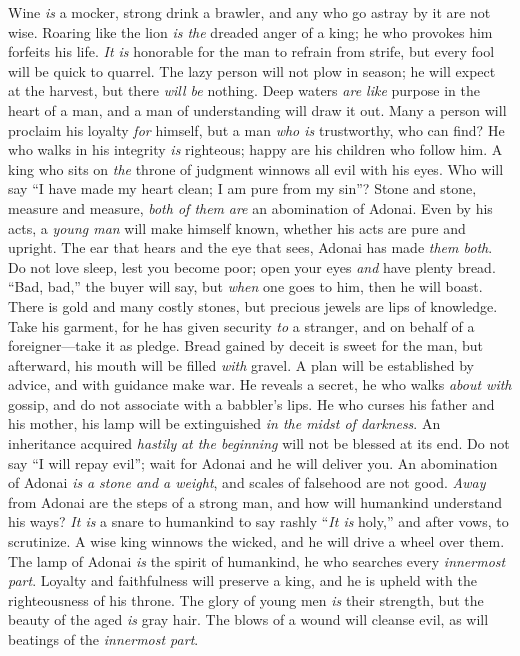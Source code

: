 \begin{biblechapter} %
\verse Wine \textit{is} a mocker, strong drink a brawler, 
and any who go astray by it are not wise.
\verse Roaring like the lion \textit{is the} dreaded anger of a king; 
he who provokes him forfeits his life.
\verse \textit{It is} honorable for the man to refrain from strife, 
but every fool will be quick to quarrel.
\verse The lazy person will not plow in season; 
he will expect at the harvest, but there \textit{will be} nothing.
\verse Deep waters \textit{are like} purpose in the heart of a man, 
and a man of understanding will draw it out.
\verse Many a person will proclaim his loyalty \textit{for} himself, 
but a man \textit{who is} trustworthy, who can find?
\verse He who walks in his integrity \textit{is} righteous; 
happy are his children who follow him.
\verse A king who sits on \textit{the} throne of judgment 
winnows all evil with his eyes.
\verse Who will say “I have made my heart clean; 
I am pure from my sin”?
\verse Stone and stone, measure and measure, 
\textit{both of them} \textit{are} an abomination of Adonai.
\verse Even by his acts, a \textit{young man} will make himself known, 
whether his acts are pure and upright.
\verse The ear that hears and the eye that sees, 
Adonai has made \textit{them both}.
\verse Do not love sleep, lest you become poor; 
open your eyes \textit{and} have plenty bread.
\verse “Bad, bad,” the buyer will say, 
but \textit{when} one goes to him, then he will boast.
\verse There is gold and many costly stones, 
but precious jewels are lips of knowledge.
\verse Take his garment, for he has given security \textit{to} a stranger, 
and on behalf of a foreigner—take it as pledge.
\verse Bread gained by deceit is sweet for the man, 
but afterward, his mouth will be filled \textit{with} gravel.
\verse A plan will be established by advice, 
and with guidance make war.
\verse He reveals a secret, he who walks \textit{about with} gossip, 
and do not associate with a babbler’s lips.
\verse He who curses his father and his mother, 
his lamp will be extinguished \textit{in the midst of darkness}.
\verse An inheritance acquired \textit{hastily} \textit{at the beginning} 
will not be blessed at its end.
\verse Do not say “I will repay evil”; 
wait for Adonai and he will deliver you.
\verse An abomination of Adonai \textit{is} \textit{a stone and a weight}, 
and scales of falsehood are not good.
\verse \textit{Away} from Adonai are the steps of a strong man, 
and how will humankind understand his ways?
\verse \textit{It is} a snare to humankind to say rashly “\textit{It is} holy,” 
and after vows, to scrutinize.
\verse A wise king winnows the wicked, 
and he will drive a wheel over them.
\verse The lamp of Adonai \textit{is} the spirit of humankind, 
he who searches every \textit{innermost part}.
\verse Loyalty and faithfulness will preserve a king, 
and he is upheld with the righteousness of his throne.
\verse The glory of young men \textit{is} their strength, 
but the beauty of the aged \textit{is} gray hair.
\verse The blows of a wound will cleanse evil, 
as will beatings of the \textit{innermost part}.
\end{biblechapter}


